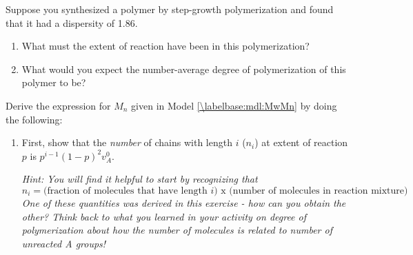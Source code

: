 \begin{activity}
\begin{ctqs}
\begin{solution}[1.5in]
			\end{solution}
			
			
\end{ctqs}

\begin{exercises}

		\exercise Suppose you synthesized a polymer by step-growth polymerization and found that it had a dispersity of 1.86.
		
			\begin{enumerate}
				\item What must the extent of reaction have been in this polymerization?
		
					\begin{solution}
					\end{solution}
					
				\item What would you expect the number-average degree of polymerization of this polymer to be?
		
					\begin{solution}
					\instructordisplay{
						\begin{equation*}
							N_n = \frac{1}{1-p} = \frac{1}{1-0.86} = 7.1
						\end{equation*}
					}
					\end{solution}
			\end{enumerate}
			
		\exercise Derive the expression for $M_n$ given in Model \ref{\labelbase:mdl:MwMn} by doing the following: \label{labelbase:exc:MnMw}
		
			\begin{enumerate}
				\item First, show that the \emph{number} of chains with length $i$ ($n_i$) at extent of reaction $p$ is $p^{i-1}(1-p)^2v_A^0$.
				
					\emph{Hint: You will find it helpful to start by recognizing that}
					\begin{equation*}
						n_i = \text{(fraction of molecules that }\text{have length }i\text{) x (number of molecules in reaction mixture)}
					\end{equation*}
					\emph{One of these quantities was derived in this exercise - how can you obtain the other?  Think back to what you learned in your activity on degree of polymerization about how the number of molecules is related to number of unreacted A groups!}
					

\end{enumerate}
\end{exercises}
\end{activity}
